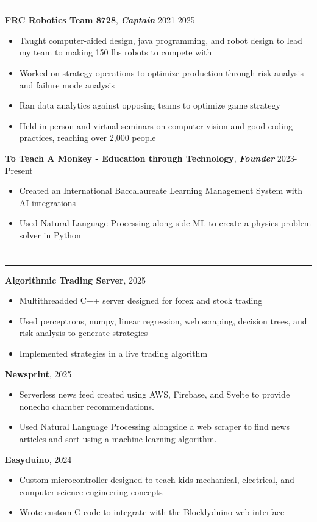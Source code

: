 \documentclass{article}[11pt]
\newcommand{\underlinedsection}[1]{ \section*{\sc{#1}}
	\rule{\textwidth}{1pt} }
\newenvironment{denseitemize} %
{ \begin{itemize}[leftmargin = 20pt, topsep = 0pt, itemsep = 0pt] }
{\end{itemize} }
\newcommand{\job}[3]{ {\textbf{#1}, \textit{\textbf{#2}} \hfill {#3}} }
\begin{document}
\underlinedsection{Other experience}
\job{FRC Robotics Team 8728}{Captain}{2021-2025}
\begin{denseitemize}
	\item Taught computer-aided design, java programming, and robot design to lead my team to making 150 lbs robots to compete with
    \item Worked on strategy operations to optimize production through risk analysis and failure mode analysis
    \item Ran data analytics against opposing teams to optimize game strategy
    \item Held in-person and virtual seminars on computer vision and good coding practices, reaching over 2,000 people
\end{denseitemize}
\job{To Teach A Monkey - Education through Technology}{Founder}{2023-Present}
\begin{denseitemize}
	\item Created an International Baccalaureate Learning Management System with AI integrations
    \item Used Natural Language Processing along side ML to create a physics problem solver in Python
    
    
\end{denseitemize}
\underlinedsection{Projects}
\job{Algorithmic Trading Server}{}{2025}
\begin{denseitemize}
	\item Multithreadded C++ server designed for forex and stock trading 
    \item Used perceptrons, numpy, linear regression, web scraping, decision trees, and risk analysis to generate strategies
    \item Implemented strategies in a live trading algorithm  
\end{denseitemize}
\job{Newsprint}{}{2025}
\begin{denseitemize}
	\item Serverless news feed created using AWS, Firebase, and Svelte to provide nonecho chamber recommendations.
    \item Used Natural Language Processing alongside a web scraper to find news articles and sort using a machine learning algorithm.
\end{denseitemize}
\job{Easyduino}{}{2024}
\begin{denseitemize}
	\item Custom microcontroller designed to teach kids mechanical, electrical, and computer science engineering concepts
    \item Wrote custom C code to integrate with the Blocklyduino web interface
\end{denseitemize}


\thispagestyle{empty}
\end{document}
